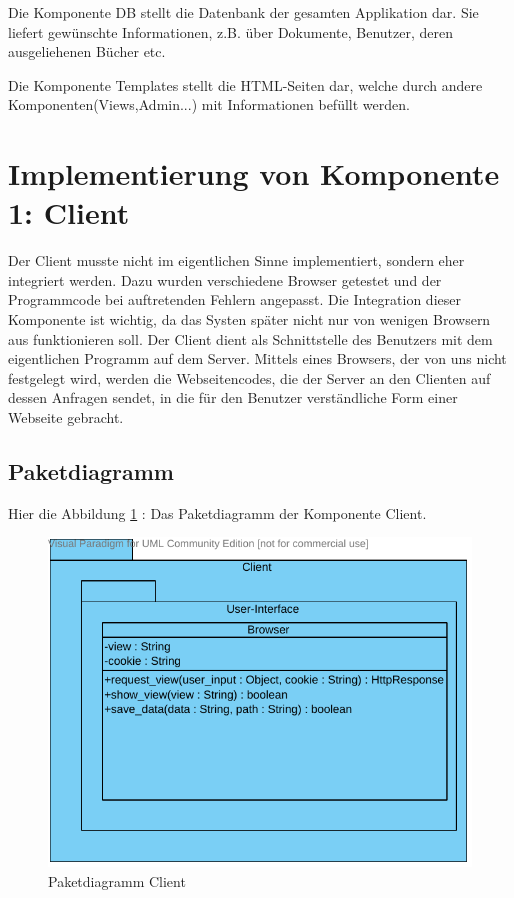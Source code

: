 Die Komponente DB stellt die Datenbank der gesamten Applikation dar.
Sie liefert gewünschte Informationen, z.B. über Dokumente, Benutzer, deren 
ausgeliehenen Bücher etc.

Die Komponente Templates stellt die HTML-Seiten dar, welche durch andere 
Komponenten(Views,Admin...) mit Informationen befüllt werden.    



\section{Implementierung von Komponente
         1: Client}


Der Client musste nicht im eigentlichen Sinne implementiert, sondern eher
integriert werden. Dazu wurden verschiedene Browser getestet und der
Programmcode bei auftretenden Fehlern angepasst. Die Integration dieser
Komponente ist wichtig, da das Systen später nicht nur von wenigen Browsern aus
funktionieren soll.
Der Client dient als Schnittstelle des Benutzers mit dem eigentlichen Programm
auf dem Server. Mittels eines Browsers, der von uns nicht festgelegt wird, werden
die Webseitencodes, die der Server an den Clienten auf dessen Anfragen sendet,
in die für den Benutzer verständliche Form einer Webseite gebracht.

\subsection{Paketdiagramm}
Hier die Abbildung \ref{fig:PDclient} : Das Paketdiagramm der Komponente Client.
\begin{figure}[H]
\includegraphics[width=0.8\linewidth]{bilder/Paketdiagramm_client.pdf}
\caption{Paketdiagramm Client}
\label{fig:PDclient}
\end{figure}
